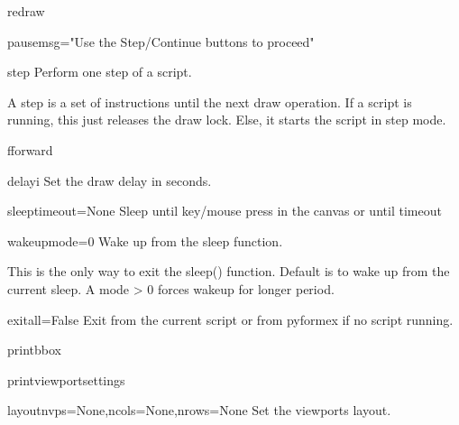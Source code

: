 \begin{funcdesc}{redraw}{}
\end{funcdesc}

\begin{funcdesc}{pause}{msg="Use the Step/Continue buttons to proceed"}
\end{funcdesc}

\begin{funcdesc}{step}{}
Perform one step of a script.

A step is a set of instructions until the next draw operation.
If a script is running, this just releases the draw lock.
Else, it starts the script in step mode.

\end{funcdesc}

\begin{funcdesc}{fforward}{}
\end{funcdesc}

\begin{funcdesc}{delay}{i}
Set the draw delay in seconds.
\end{funcdesc}

\begin{funcdesc}{sleep}{timeout=None}
Sleep until key/mouse press in the canvas or until timeout
\end{funcdesc}

\begin{funcdesc}{wakeup}{mode=0}
Wake up from the sleep function.

This is the only way to exit the sleep() function.
Default is to wake up from the current sleep. A mode > 0
forces wakeup for longer period.

\end{funcdesc}

\begin{funcdesc}{exit}{all=False}
Exit from the current script or from pyformex if no script running.
\end{funcdesc}

\begin{funcdesc}{printbbox}{}
\end{funcdesc}

\begin{funcdesc}{printviewportsettings}{}
\end{funcdesc}

\begin{funcdesc}{layout}{nvps=None,ncols=None,nrows=None}
Set the viewports layout.
\end{funcdesc}

